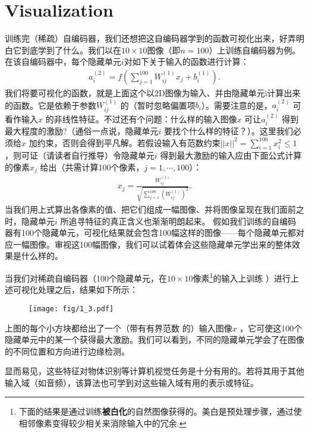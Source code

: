 \section{Visualization}
训练完（稀疏）自编码器，我们还想把这自编码器学到的函数可视化出来，好弄明白它到底学到了什么。我们以在$10\times10$图像（即$n=100$）上训练自编码器为例。在该自编码器中，每个隐藏单元$i$对如下关于输入的函数进行计算：
\begin{align}
a^{(2)}_i = f\left(\sum_{j=1}^{100} W^{(1)}_{ij} x_j  + b^{(1)}_i \right).
\nonumber \end{align}
我们将要可视化的函数，就是上面这个以2D图像为输入、并由隐藏单元i计算出来的函数。它是依赖于参数$ W^{(1)}_{ij}$ 的（暂时忽略偏置项$b_i$）。需要注意的是，$ a^{(2)}_i$ 可看作输入$ x$ 的非线性特征。不过还有个问题：什么样的输入图像$ x$ 可让$ a^{(2)}_i$ 得到最大程度的激励?（通俗一点说，隐藏单元$ i$ 要找个什么样的特征？）。这里我们必须给$ x$ 加约束，否则会得到平凡解。若假设输入有范数约束$ ||x||^2 = \sum_{i=1}^{100} x_i^2 \leq 1$ ，则可证（请读者自行推导）令隐藏单元$ i$ 得到最大激励的输入应由下面公式计算的像素$ x_j$ 给出（共需计算100个像素，$j=1,\cdots,100$）：
\begin{align}
x_j = \frac{W^{(1)}_{ij}}{\sqrt{\sum_{j=1}^{100} (W^{(1)}_{ij})^2}}.
\nonumber \end{align}
当我们用上式算出各像素的值、把它们组成一幅图像、并将图像呈现在我们面前之时，隐藏单元$ i$ 所追寻特征的真正含义也渐渐明朗起来。
假如我们训练的自编码器有100个隐藏单元，可视化结果就会包含100幅这样的图像——每个隐藏单元都对应一幅图像。审视这100幅图像，我们可以试着体会这些隐藏单元学出来的整体效果是什么样的。

当我们对稀疏自编码器（100个隐藏单元，在$10\times 10$像素\footnote{下面的结果是通过训练\textbf{被白化}的自然图像获得的。美白是预处理步骤，通过使相邻像素变得较少相关来消除输入中的冗余.}的输入上训练 ）进行上述可视化处理之后，结果如下所示：

\begin{figure}[H]
\centering
\texttt{[image: fig/1\_3.pdf]}
\end{figure}

上图的每个小方块都给出了一个（带有有界范数 的）输入图像$ x$ ，它可使这100个隐藏单元中的某一个获得最大激励。我们可以看到，不同的隐藏单元学会了在图像的不同位置和方向进行边缘检测。

显而易见，这些特征对物体识别等计算机视觉任务是十分有用的。若将其用于其他输入域（如音频），该算法也可学到对这些输入域有用的表示或特征。


